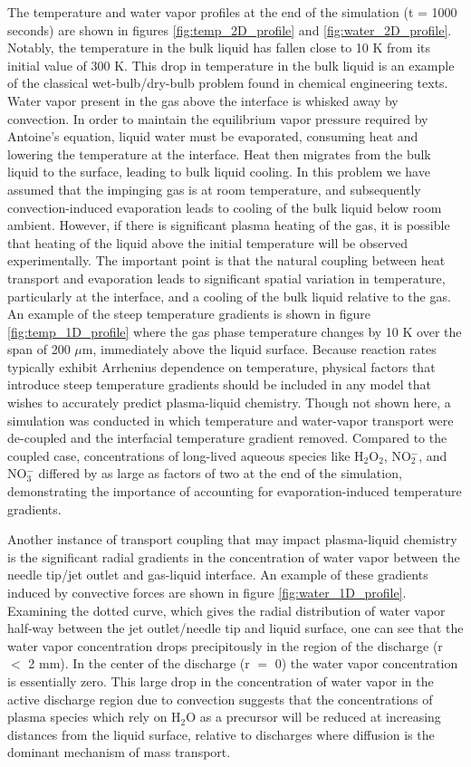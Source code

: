 The temperature and water vapor profiles at the end of the simulation (t = 1000 seconds) are shown in figures \ref{fig:temp_2D_profile} and \ref{fig:water_2D_profile}. Notably, the temperature in the bulk liquid has fallen close to 10 K from its initial value of 300 K. This drop in temperature in the bulk liquid is an example of the classical wet-bulb/dry-bulb problem found in chemical engineering texts. Water vapor present in the gas above the interface is whisked away by convection. In order to maintain the equilibrium vapor pressure required by Antoine's equation, liquid water must be evaporated, consuming heat and lowering the temperature at the interface. Heat then migrates from the bulk liquid to the surface, leading to bulk liquid cooling. In this problem we have assumed that the impinging gas is at room temperature, and subsequently convection-induced evaporation leads to cooling of the bulk liquid below room ambient. However, if there is significant plasma heating of the gas, it is possible that heating of the liquid above the initial temperature will be observed experimentally. The important point is that the natural coupling between heat transport and evaporation leads to significant spatial variation in temperature, particularly at the interface, and a cooling of the bulk liquid relative to the gas. An example of the steep temperature gradients is shown in figure \ref{fig:temp_1D_profile} where the gas phase temperature changes by 10 K over the span of 200 $\mu$m, immediately above the liquid surface. Because reaction rates typically exhibit Arrhenius dependence on temperature, physical factors that introduce steep temperature gradients should be included in any model that wishes to accurately predict plasma-liquid chemistry. Though not shown here, a simulation was conducted in which temperature and water-vapor transport were de-coupled and the interfacial temperature gradient removed. Compared to the coupled case, concentrations of long-lived aqueous species like H$_2$O$_2$, NO$_2^-$, and NO$_3^-$ differed by as large as factors of two at the end of the simulation, demonstrating the importance of accounting for evaporation-induced temperature gradients.

Another instance of transport coupling that may impact plasma-liquid chemistry is the significant radial gradients in the concentration of water vapor between the needle tip/jet outlet and gas-liquid interface. An example of these gradients induced by convective forces are shown in figure \ref{fig:water_1D_profile}. Examining the dotted curve, which gives the radial distribution of water vapor half-way between the jet outlet/needle tip and liquid surface, one can see that the water vapor concentration drops precipitously in the region of the discharge (r $<$ 2 mm). In the center of the discharge (r $=$ 0) the water vapor concentration is essentially zero. This large drop in the concentration of water vapor in the active discharge region due to convection suggests that the concentrations of plasma species which rely on H$_2$O as a precursor will be reduced at increasing distances from the liquid surface, relative to  discharges where diffusion is the dominant mechanism of mass transport.

